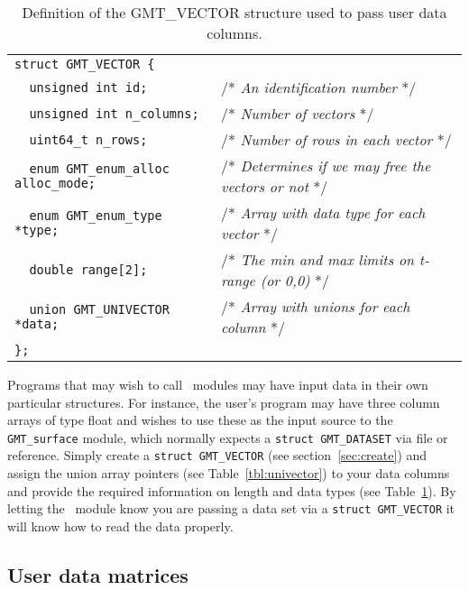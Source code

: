 \documentclass[11pt]{report}
\begin{document}
\begin{table}[h]
\small
\centering
\begin{tabular}{ll} \hline
\verb!struct GMT_VECTOR {!               & \\
\verb!  unsigned int id;!                & /* \emph{An identification number} */ \\
\verb!  unsigned int n_columns;!         & /* \emph{Number of vectors} */\\
\verb!  uint64_t n_rows;!                & /* \emph{Number of rows in each vector} */ \\
\verb!  enum GMT_enum_alloc alloc_mode;! & /* \emph{Determines if we may free the vectors or not} */\\
\verb!  enum GMT_enum_type *type;!       & /* \emph{Array with data type for each vector} */\\
\verb!  double range[2];!                & /* \emph{The min and max limits on t-range (or 0,0) } */\\
\verb!  union GMT_UNIVECTOR *data;!      & /* \emph{Array with unions for each column} */\\
\verb!};!                                & \\
\hline
\end{tabular}
\caption{Definition of the GMT\_VECTOR structure used to pass user data columns.}
\label{tbl:vector}
\end{table}
\noindent
Programs that may wish to call \GMT\ modules may have input data in their own particular
structures.  For instance, the user's program may have three column arrays of type float
and wishes to use these as the input source to the \texttt{GMT\_surface} module, which normally
expects a \texttt{struct GMT\_DATASET} via file or reference.  Simply create a \texttt{struct GMT\_VECTOR}
(see section~\ref{sec:create}) and assign the union array pointers  (see Table~\ref{tbl:univector}) to your data columns and provide
the required information on length and data types (see Table~\ref{tbl:vector}).
By letting the \GMT\ module know you are passing a data set via a \texttt{struct GMT\_VECTOR} it will know how to
read the data properly.

\subsection{User data matrices}
\end{document}
